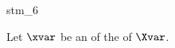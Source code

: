 \documentclass{stex}
\begin{document}
\begin{smodule}{stm_6}
  
  \begin{sassertion}[id=stm-6]
    Let $\xvar$ be an  of the  of $\Xvar$.
  \end{sassertion}
\end{smodule}
\end{document}
